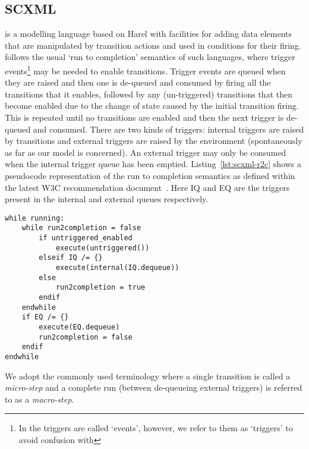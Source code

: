 

\subsection{SCXML}
\label{sec:scxml}

\SCXML is a modelling language based on Harel \statecharts with facilities for adding data elements that are manipulated by transition actions and used in conditions for their firing. \SCXML follows the usual `run to completion' semantics of such \statechart languages, where trigger events\footnote{In \SCXML the triggers are called `events', however, we refer to them as `triggers' to avoid confusion with \EventB} may be needed to enable transitions. Trigger events are queued when they are raised and then one is de-queued and consumed by firing all the transitions that it enables, followed by any (un-triggered) transitions that then become enabled due to the change of state caused by the initial transition firing. This is repeated until no transitions are enabled and then the next trigger is de-queued and consumed. There are two kinds of triggers: internal triggers are raised by transitions and external triggers are raised by the environment (spontaneously as far as our model is concerned). An external trigger may only be consumed when the internal trigger queue has been emptied. Listing~\ref{lst:scxml-r2c} shows a pseudocode representation of the run to completion semantics as defined within the latest W3C recommendation document~\cite{scxmlwebsite}. Here IQ and EQ are the triggers present in the internal and external queues respectively. 

\begin{lstlisting}[caption=Pseudocode for 'run to completion',label={lst:scxml-r2c}, frame=single, float=t]
while running:
	while run2completion = false
		if untriggered_enabled
			execute(untriggered())
		elseif IQ /= {}
			execute(internal(IQ.dequeue)) 
		else
			run2completion = true
		endif
	endwhile
	if EQ /= {}
		execute(EQ.dequeue) 
		run2completion = false
	endif
endwhile 
\end{lstlisting}

We adopt the commonly used terminology where a single transition is called a \emph{micro-step} and a complete run (between de-queueing external triggers) is referred to as a \emph{macro-step}.

